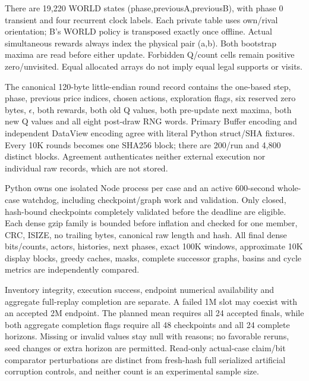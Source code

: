 \documentclass[a4paper,10pt]{article}
\begin{document}
There are 19,220 WORLD states (phase,previousA,previousB), with phase 0 transient and four recurrent clock labels. Each private table uses own/rival orientation; B's WORLD policy is transposed exactly once offline. Actual simultaneous rewards always index the physical pair (a,b). Both bootstrap maxima are read before either update. Forbidden Q/count cells remain positive zero/unvisited. Equal allocated arrays do not imply equal legal supports or visits.
\par

The canonical 120-byte little-endian round record contains the one-based step, phase, previous price indices, chosen actions, exploration flags, six reserved zero bytes, $\epsilon$, both rewards, both old Q values, both pre-update next maxima, both new Q values and all eight post-draw RNG words. Primary Buffer encoding and independent DataView encoding agree with literal Python struct/SHA fixtures. Every 10K rounds becomes one SHA256 block; there are 200/run and 4,800 distinct blocks. Agreement authenticates neither external execution nor individual raw records, which are not stored.
\par

Python owns one isolated Node process per case and an active 600-second whole-case watchdog, including checkpoint/graph work and validation. Only closed, hash-bound checkpoints completely validated before the deadline are eligible. Each dense gzip family is bounded before inflation and checked for one member, CRC, ISIZE, no trailing bytes, canonical raw length and hash. All final dense bits/counts, actors, histories, next phases, exact 100K windows, approximate 10K display blocks, greedy caches, masks, complete successor graphs, basins and cycle metrics are independently compared.
\par

Inventory integrity, execution success, endpoint numerical availability and aggregate full-replay completion are separate. A failed 1M slot may coexist with an accepted 2M endpoint. The planned mean requires all 24 accepted finals, while both aggregate completion flags require all 48 checkpoints and all 24 complete horizons. Missing or invalid values stay null with reasons; no favorable reruns, seed changes or extra horizon are permitted. Read-only actual-case claim/bit comparator perturbations are distinct from fresh-hash full serialized artificial corruption controls, and neither count is an experimental sample size.
\par
\end{document}
